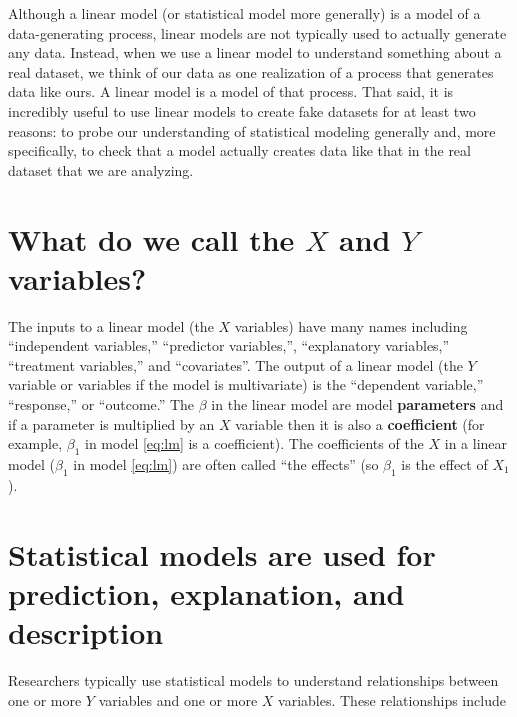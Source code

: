 \documentclass[]{book}
\begin{document}
Although a linear model (or statistical model more generally) is a model
of a data-generating process, linear models are not typically used to
actually generate any data. Instead, when we use a linear model to
understand something about a real dataset, we think of our data as one
realization of a process that generates data like ours. A linear model
is a model of that process. That said, it is incredibly useful to use
linear models to create fake datasets for at least two reasons: to probe
our understanding of statistical modeling generally and, more
specifically, to check that a model actually creates data like that in
the real dataset that we are analyzing.

\section{\texorpdfstring{What do we call the \(X\) and \(Y\)
variables?}{What do we call the X and Y variables?}}\label{what-do-we-call-the-x-and-y-variables}

The inputs to a linear model (the \(X\) variables) have many names
including ``independent variables,'' ``predictor variables,'',
``explanatory variables,'' ``treatment variables,'' and ``covariates''.
The output of a linear model (the \(Y\) variable or variables if the
model is multivariate) is the ``dependent variable,'' ``response,'' or
``outcome.'' The \(\beta\) in the linear model are model
\textbf{parameters} and if a parameter is multiplied by an \(X\)
variable then it is also a \textbf{coefficient} (for example,
\(\beta_1\) in model \eqref{eq:lm} is a coefficient). The coefficients of
the \(X\) in a linear model (\(\beta_1\) in model \eqref{eq:lm}) are often
called ``the effects'' (so \(\beta_1\) is the effect of \(X_1\)).

\section{Statistical models are used for prediction, explanation, and
description}\label{statistical-models-are-used-for-prediction-explanation-and-description}

Researchers typically use statistical models to understand relationships
between one or more \(Y\) variables and one or more \(X\) variables.
These relationships include
\end{document}
